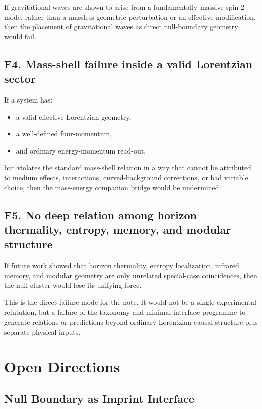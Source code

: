 \documentclass[12pt,a4paper]{article}
\theoremstyle{definition}
\theoremstyle{remark}
\newcommand{\tightlist}{%
  \setlength{\itemsep}{0pt}\setlength{\parskip}{0pt}}
\begin{document}
If gravitational waves are shown to arise from a fundamentally massive
spin-2 mode, rather than a massless geometric perturbation or an
effective modification, then the placement of gravitational waves as
direct null-boundary geometry would fail.

\subsection{F4. Mass-shell failure inside a valid Lorentzian
sector}\label{f4.-mass-shell-failure-inside-a-valid-lorentzian-sector}

If a system has:

\begin{itemize}
\tightlist
\item
  a valid effective Lorentzian geometry,
\item
  a well-defined four-momentum,
\item
  and ordinary energy-momentum read-out,
\end{itemize}

but violates the standard mass-shell relation in a way that cannot be
attributed to medium effects, interactions, curved-background
corrections, or bad variable choice, then the mass-energy companion
bridge would be undermined.

\subsection{F5. No deep relation among horizon thermality, entropy,
memory, and modular
structure}\label{f5.-no-deep-relation-among-horizon-thermality-entropy-memory-and-modular-structure}

If future work showed that horizon thermality, entropy localization,
infrared memory, and modular geometry are only unrelated special-case
coincidences, then the null cluster would lose its unifying force.

This is the direct failure mode for the note. It would not be a single
experimental refutation, but a failure of the taxonomy and minimal-interface programme to generate relations or predictions beyond ordinary Lorentzian causal structure plus separate physical inputs.

\section{Open Directions}\label{open-directions}

\subsection{Null Boundary as Imprint
Interface}\label{null-boundary-as-imprint-interface}
\end{document}
